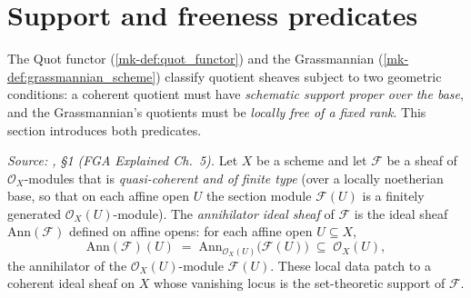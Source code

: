 \section{Support and freeness predicates}
\label{mk-sec:quot_predicates}

The Quot functor (\ref{mk-def:quot_functor}) and the Grassmannian
(\ref{mk-def:grassmannian_scheme}) classify quotient sheaves subject to two
geometric conditions: a coherent quotient must have \emph{schematic support
proper over the base}, and the Grassmannian's quotients must be \emph{locally
free of a fixed rank}. This section introduces both predicates.

\begin{definition}\label{mk-def:modules_annihilator}
  \leanok

  \textit{Source: \cite{nitsure-hilbert-quot}, \S 1 (FGA Explained Ch.~5).}
  Let \(X\) be a scheme and let \(\mathcal{F}\) be a sheaf of
  \(\mathcal{O}_X\)-modules that is \emph{quasi-coherent and of finite type}
  (over a locally noetherian base, so that on each affine open \(U\) the section
  module \(\mathcal{F}(U)\) is a finitely generated \(\mathcal{O}_X(U)\)-module).
  The \emph{annihilator ideal sheaf} of \(\mathcal{F}\) is the ideal sheaf
  \(\mathrm{Ann}(\mathcal{F})\) defined on affine opens: for each affine open
  \(U \subseteq X\),
  \[
    \mathrm{Ann}(\mathcal{F})(U)
    \;=\; \mathrm{Ann}_{\mathcal{O}_X(U)}\bigl(\mathcal{F}(U)\bigr)
    \;\subseteq\; \mathcal{O}_X(U),
  \]
  the annihilator of the \(\mathcal{O}_X(U)\)-module \(\mathcal{F}(U)\). These
  local data patch to a coherent ideal sheaf on \(X\) whose vanishing locus is
  the set-theoretic support of \(\mathcal{F}\).


\end{definition}
